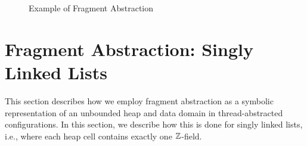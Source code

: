 \begin{center}
\begin{figure}

\caption{Example of Fragment Abstraction}
\label{lazylist}
\end{figure}
\end{center}
\section{Fragment Abstraction: Singly Linked Lists}
\label{sec:annotations}
This section describes how we employ fragment abstraction as a symbolic
representation of an unbounded heap and data domain in
thread-abstracted configurations. In this section, we describe how this is done
for singly linked lists, i.e., where each heap cell contains exactly one
${\mathbb Z}$-field.


